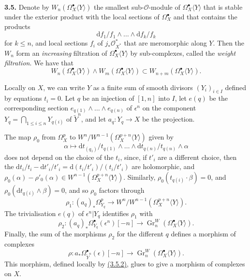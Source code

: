 \documentclass{report}
\newenvironment{rmenv}[1]
  {\phantomsection\par\medskip\noindent\textbf{#1.}\rmfamily}
  {\par\medskip}
\renewcommand{\cal}[1]{{\mathcal{#1}}}
\newcommand{\dd}{\mathrm{d}}
\renewcommand{\leq}{\leqslant}
\DeclareMathOperator{\Gr}{Gr}
\newcommand{\oldpage}[1]{\marginpar{\footnotesize$\Big\vert$ \textit{p.~#1}}}
\begin{document}
\begin{rmenv}{3.5}
\label{II.3.5}
  Denote by $W_n(\Omega_X^\bullet\langle Y\rangle)$ the smallest sub-$\cal{O}$-module of $\Omega_X^\bullet\langle Y\rangle$ that is stable under the exterior product with the local sections of $\Omega_X^\bullet$ and that contains the products
  \[
    \dd f_1/f_1\wedge\ldots\wedge\dd f_k/f_k
  \]
\oldpage{76}
  for $k\leq n$, and local sections $f_i$ of $j_*\cal{O}_{X^*}^*$ that are meromorphic along $Y$.
  Then the $W_n$ form an \emph{increasing} filtration of $\Omega_X^\bullet\langle Y\rangle$ by sub-complexes, called the \emph{weight filtration}.
  We have that
  \[
  \label{II.3.5.1}
    W_n(\Omega_X^\bullet\langle Y\rangle) \wedge W_m(\Omega_X^\bullet\langle Y\rangle)
    \subset W_{n+m}(\Omega_X^\bullet\langle Y\rangle).
  \tag{3.5.1}
  \]

  Locally on $X$, we can write $Y$ as a finite sum of smooth divisors $(Y_i)_{i\in I}$ defined by equations $t_i=0$.
  Let $q$ be an injection of $[1,n]$ into $I$, let $e(q)$ be the corresponding section $e_{q(1)}\wedge\ldots\wedge e_{q(n)}$ of $\epsilon^n$ on the component $Y_q=\bigcap_{1\leq i\leq n}Y_{q(i)}$ of $\widetilde{Y}^n$, and let $a_q\colon Y_q\to X$ be the projection.

  The map $\rho_0$ from $\Omega_X^p$ to $W^n/W^{n-1}(\Omega_X^{p+n}\langle Y\rangle)$ given by
  \[
  \label{II.3.5.2}
    \alpha
    \longmapsto \dd t_{(q_1)}/t_{q(1)}\wedge\ldots\wedge\dd t_{q(n)}/t_{q(n)}\wedge\alpha
  \tag{3.5.2}
  \]
  does not depend on the choice of the $t_i$, since, if $t'_i$ are a different choice, then the $\dd t_i/t_i-\dd t'_i/t'_i=\dd(t_i/t'_i)/(t_i/t'_i)$ are holomorphic, and $\rho_0(\alpha)-\rho'_0(\alpha)\in W^{n-1}(\Omega_X^{p+n}\langle Y\rangle)$.
  Similarly, $\rho_0(t_{q(i)}\cdot\beta)=0$, and $\rho_0(\dd t_{q(i)}\wedge\beta)=0$, and so $\rho_0$ factors through
  \[
    \rho_1\colon (a_q)_*\Omega_{Y_q}^p \to W^n/W^{n-1}(\Omega_X^{p+n}\langle Y\rangle).
  \]
  The trivialisation $e(q)$ of $\epsilon^n|Y_q$ identifies $\rho_1$ with
  \[
    \rho_2\colon (a_q)_*\Omega_{Y_q}^\bullet(\epsilon^n)[-n] \to \Gr_n^W(\Omega_X^\bullet\langle Y\rangle).
  \]
  Finally, the sum of the morphisms $\rho_2$ for the different $q$ defines a morphism of complexes
  \[
  \label{II.3.5.3}
    \rho\colon a_*\Omega_{\widetilde{Y}^n}^\bullet(\epsilon)[-n] \to \Gr_n^W(\Omega_X^\bullet\langle Y\rangle).
  \tag{3.5.3}
  \]
  This morphism, defined locally by \hyperref[II.3.5.2]{(3.5.2)}, glues to give a morphism of complexes on $X$.
\end{rmenv}
\end{document}
